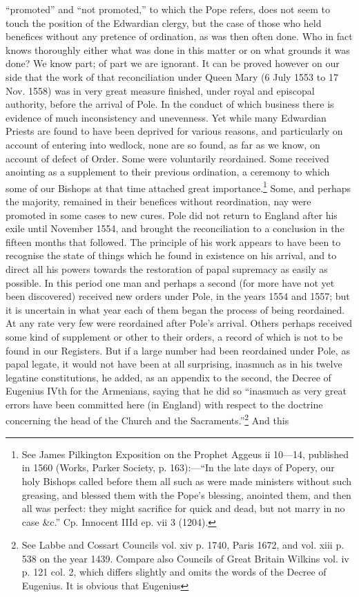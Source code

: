 “promoted” and “not promoted,” to which the Pope refers, does not seem to touch the position of the Edwardian clergy, but the case of those who held benefices without any pretence of ordination, as was then often done. Who in fact knows thoroughly either what was done in this matter or on what grounds it was done? We know part; of part we are ignorant. It can be proved however on our side that the work of that reconciliation under Queen Mary (6 July 1553 to 17 Nov. 1558) was in very great measure finished, under royal and episcopal authority, before the arrival of Pole. In the conduct of which business there is evidence of much inconsistency and unevenness. Yet while many Edwardian Priests are found to have been deprived for various reasons, and particularly on account of entering into wedlock, none are so found, as far as we know, on account of defect of Order. Some were voluntarily reordained. Some received anointing as a supplement to their previous ordination, a ceremony to which some of our Bishops at that time attached great importance.\footnote{See James Pilkington Exposition on the Prophet Aggeus ii 10—14, published in 1560 (Works, Parker Society, p. 163):—“In the late days of Popery, our holy Bishops called before them all such as were made ministers without such greasing, and blessed them with the Pope’s blessing, anointed them, and then all was perfect: they might sacrifice for quick and dead, but not marry in no case \&c.” Cp. Innocent IIId ep. vii 3 (1204).} Some, and perhaps the majority, remained in their benefices without reordination, nay were promoted in some cases to new cures. Pole did not return to England after his exile until November 1554, and brought the reconciliation to a conclusion in the fifteen months that followed. The principle of his work appears to have been to recognise the state of things which he found in existence on his arrival, and to direct all his powers towards the restoration of papal supremacy as easily as possible. In this period one man and perhaps a second (for more have not yet been discovered) received new orders under Pole, in the years 1554 and 1557; but it is uncertain in what year each of them began the process of being reordained. At any rate very few were reordained after Pole’s arrival. Others perhaps received some kind of supplement or other to their orders, a record of which is not to be found in our Registers. But if a large number had been reordained under Pole, as papal legate, it would not have been at all surprising, inasmuch as in his twelve legatine constitutions, he added, as an appendix to the second, the Decree of Eugenius IVth for the Armenians, saying that he did so “inasmuch as very great errors have been committed here (in England) with respect to the doctrine concerning the head of the Church and the Sacraments.”\footnote{See Labbe and Cossart Councils vol. xiv p. 1740, Paris 1672, and vol. xiii p. 538 on the year 1439. Compare also Councils of Great Britain Wilkins vol. iv p. 121 col. 2, which differs slightly and omits the words of the Decree of Eugenius. It is obvious that Eugenius} And this

